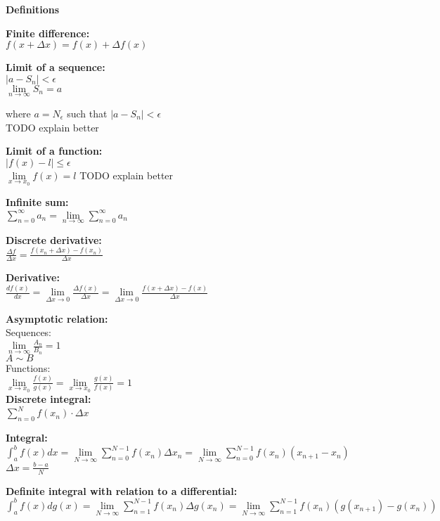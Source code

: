 \documentclass[12pt,a4paper]{report}
\begin{document}
	
	\begin{center}\textbf{Definitions}\end{center}
	
	\textbf{Finite difference:}\\
	$f(x + \Delta x) = f(x) + \Delta f(x)$
	
	\textbf{Limit of a sequence:}\\	
	$|a - S_n| < \epsilon$\\
	$\lim\limits_{n \to \infty} S_n = a$
	
	where $a = N_\epsilon$ such that $|a - S_n| < \epsilon$\\
	TODO explain better

	\textbf{Limit of a function:}\\
	$|f(x) - l| \leq \epsilon$\\
	$\lim\limits_{x \to x_0} f(x) = l$
	TODO explain better
	
	\textbf{Infinite sum:}\\
	$\sum_{n = 0}^{\infty} a_n = \lim\limits_{n \to \infty} \sum_{n = 0}^{\infty} a_n$
	
	\textbf{Discrete derivative:}\\
	$\frac{\Delta f}{\Delta x} = \frac{f(x_n + \Delta x) - f(x_n)}{\Delta x}$
	
	\textbf{Derivative:}\\
	$\frac{df(x)}{dx} = \lim\limits_{\Delta x \to 0} \frac{\Delta f(x)}{\Delta x} = \lim\limits_{\Delta x \to 0} \frac{f(x + \Delta x) - f(x)}{\Delta x}$
	
	\textbf{Asymptotic relation:}\\
	Sequences:\\
	$\lim\limits_{n \to \infty} \frac{A_n}{B_n} = 1$\\
	$A \sim B$\\
	Functions:\\
	$\lim\limits_{x \to x_0} \frac{f(x)}{g(x)} = \lim\limits_{x \to x_0} \frac{g(x)}{f(x)} = 1$\\
	
	\textbf{Discrete integral:}\\
	$\sum_{n = 0}^{N} f(x_n) \cdot \Delta x$
	
	\textbf{Integral:}\\
	$\int_{a}^{b} f(x) dx = \lim\limits_{N \to \infty} \sum_{n = 0}^{N - 1} f(x_n) \Delta x_n = \lim\limits_{N \to \infty} \sum_{n = 0}^{N - 1} f(x_n)(x_{n+1} - x_n)$\\
	$\Delta x = \frac{b - a}{N}$
	
	\textbf{Definite integral with relation to a differential:}\\
	$\int_{a}^{b} f(x)dg(x) = \lim\limits_{N \to \infty} \sum_{n = 1}^{N - 1} f(x_n)\Delta g(x_n) = \lim\limits_{N \to \infty} \sum_{n = 1}^{N - 1} f(x_n)(g(x_{n+1}) - g(x_n))$
	
\end{document}
